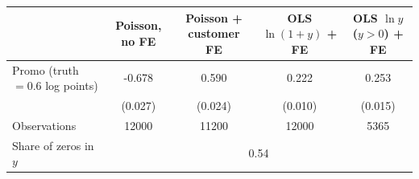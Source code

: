 \begin{tabular}{lcccc}\toprule
 & Poisson, no FE & Poisson + customer FE & OLS $\ln(1+y)$ + FE & OLS $\ln y$ ($y>0$) + FE \\ \midrule
Promo (truth $= 0.6$ log points) & -0.678 & 0.590 & 0.222 & 0.253 \\
 & (0.027) & (0.024) & (0.010) & (0.015) \\
Observations & 12000 & 11200 & 12000 & 5365 \\
Share of zeros in $y$ & \multicolumn{4}{c}{0.54}  \\
\bottomrule\end{tabular}
